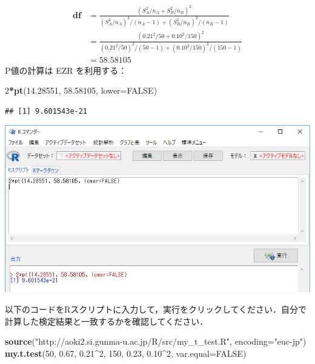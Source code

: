 \documentclass[11pt,]{problemset}
\newenvironment{Shaded}{\begin{snugshade}}{\end{snugshade}}
\newcommand{\DataTypeTok}[1]{\textcolor[rgb]{0.13,0.29,0.53}{#1}}
\newcommand{\DecValTok}[1]{\textcolor[rgb]{0.00,0.00,0.81}{#1}}
\newcommand{\FloatTok}[1]{\textcolor[rgb]{0.00,0.00,0.81}{#1}}
\newcommand{\KeywordTok}[1]{\textcolor[rgb]{0.13,0.29,0.53}{\textbf{#1}}}
\newcommand{\NormalTok}[1]{#1}
\newcommand{\OperatorTok}[1]{\textcolor[rgb]{0.81,0.36,0.00}{\textbf{#1}}}
\newcommand{\OtherTok}[1]{\textcolor[rgb]{0.56,0.35,0.01}{#1}}
\newcommand{\StringTok}[1]{\textcolor[rgb]{0.31,0.60,0.02}{#1}}
\begin{document}
\[
\begin{aligned}
\mathbf{df} & = \frac{(S^2_A/n_A + S^2_B/n_B)^2}{(S_A^2/n_A)^2/(n_A-1)+(S_B^2/n_B)^2/(n_B-1)} \\
            & = \frac{(0.21^2/50 + 0.10^2/150)^2}{(0.21^2/50)^2/(50-1)+(0.10^2/150)^2/(150-1)} \\
            & = 58.58105
\end{aligned}
\] P値の計算は EZR を利用する：

\begin{Shaded}
\begin{Highlighting}[]
\DecValTok{2}\OperatorTok{*}\KeywordTok{pt}\NormalTok{(}\FloatTok{14.28551}\NormalTok{, }\FloatTok{58.58105}\NormalTok{, }\DataTypeTok{lower=}\OtherTok{FALSE}\NormalTok{)}
\end{Highlighting}
\end{Shaded}

\begin{verbatim}
## [1] 9.601543e-21
\end{verbatim}

\begin{center}\includegraphics[width=0.9\linewidth]{pic/tvaluepvalue01} \end{center}
\bigskip

以下のコードをRスクリプトに入力して，実行をクリックしてください．自分で計算した検定結果と一致するかを確認してください．

\begin{Shaded}
\begin{Highlighting}[]
\KeywordTok{source}\NormalTok{(}\StringTok{"http://aoki2.si.gunma-u.ac.jp/R/src/my_t_test.R"}\NormalTok{, }\DataTypeTok{encoding=}\StringTok{"euc-jp"}\NormalTok{)}
\KeywordTok{my.t.test}\NormalTok{(}\DecValTok{50}\NormalTok{, }\FloatTok{0.67}\NormalTok{, }\FloatTok{0.21}\OperatorTok{^}\DecValTok{2}\NormalTok{, }\DecValTok{150}\NormalTok{, }\FloatTok{0.23}\NormalTok{, }\FloatTok{0.10}\OperatorTok{^}\DecValTok{2}\NormalTok{, }\DataTypeTok{var.equal=}\OtherTok{FALSE}\NormalTok{)}
\end{Highlighting}
\end{Shaded}
\end{document}
